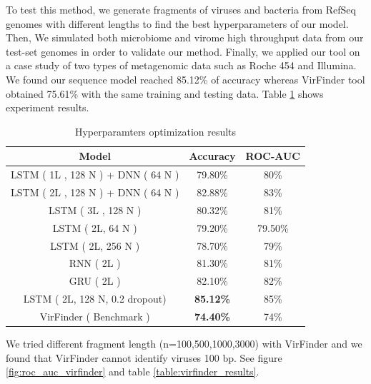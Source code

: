 \documentclass[conference]{IEEEtran}
\begin{document}
To test this method, we generate fragments of viruses and bacteria from RefSeq genomes with different lengths to find the best hyperparameters of our model. Then, We simulated both microbiome and virome high throughput data from our test-set genomes in order to validate our method. Finally, we applied our tool on a case study of two types of metagenomic data such as Roche 454 and Illumina. We found our sequence model reached 85.12\% of accuracy whereas VirFinder tool obtained 75.61\% with the same training and testing data. Table \ref{table:model_results} shows experiment results.

\begin{table}[h!]
	\centering
	\begin{tabular}{||c c c||} 
		Model &	Accuracy&	ROC-AUC \\ [0.5ex] 
		\hline\hline
		LSTM ( 1L , 128 N ) + DNN ( 64 N ) &	79.80\% &	80\% \\
		LSTM ( 2L , 128 N ) + DNN ( 64 N ) &	82.88\%	& 83\% \\
		LSTM ( 3L , 128 N )  &	80.32\%	& 81\% \\ 
		LSTM ( 2L, 64 N ) &	79.20\%	& 79.50\% \\ 
		LSTM ( 2L, 256 N ) &	78.70\%	& 79\% \\
		RNN ( 2L ) &	81.30\%	& 81\% \\
		GRU ( 2L ) &	82.10\% &	82\% \\
		LSTM ( 2L, 128 N, 0.2 dropout) &	\textbf{85.12\%} 	& 85\% \\
		VirFinder ( Benchmark ) &	\textbf{74.40\%} &	74\% \\[1ex]
	\end{tabular}
	\caption{Hyperparamters optimization results}
	\label{table:model_results}
\end{table}

We tried different fragment length (n=100,500,1000,3000) with VirFinder and we found that VirFinder cannot identify viruses 100 bp. See figure \ref{fig:roc_auc_virfinder} and table \ref{table:virfinder_results}.
\end{document}
